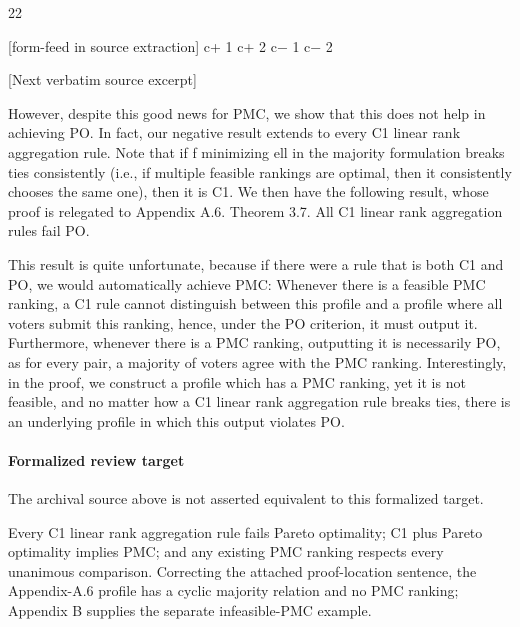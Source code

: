\documentclass[10pt]{article}
\begin{document}
\begin{ReviewVerbatim}
                                                    22

[form-feed in source extraction]
                                 c+
                                  1                c+
                                                    2                          c−
                                                                                1             c−
                                                                                               2



[Next verbatim source excerpt]

However, despite this good news for PMC, we show that this does not help in achieving PO. In fact,
our negative result extends to every C1 linear rank aggregation rule. Note that if f minimizing ell in
the majority formulation breaks ties consistently (i.e., if multiple feasible rankings are optimal, then
it consistently chooses the same one), then it is C1. We then have the following result, whose proof
is relegated to Appendix A.6.
Theorem 3.7. All C1 linear rank aggregation rules fail PO.

This result is quite unfortunate, because if there were a rule that is both C1 and PO, we would
automatically achieve PMC: Whenever there is a feasible PMC ranking, a C1 rule cannot distinguish
between this profile and a profile where all voters submit this ranking, hence, under the PO criterion,
it must output it. Furthermore, whenever there is a PMC ranking, outputting it is necessarily PO,
as for every pair, a majority of voters agree with the PMC ranking. Interestingly, in the proof, we
construct a profile which has a PMC ranking, yet it is not feasible, and no matter how a C1 linear
rank aggregation rule breaks ties, there is an underlying profile in which this output violates PO.
\end{ReviewVerbatim}


\paragraph{Formalized review target}
The archival source above is not asserted equivalent to this formalized target.
\begin{ReviewVerbatim}
Every C1 linear rank aggregation rule fails Pareto optimality; C1 plus Pareto optimality implies PMC; and any existing PMC ranking respects every unanimous comparison. Correcting the attached proof-location sentence, the Appendix-A.6 profile has a cyclic majority relation and no PMC ranking; Appendix B supplies the separate infeasible-PMC example.
\end{ReviewVerbatim}
\end{document}
